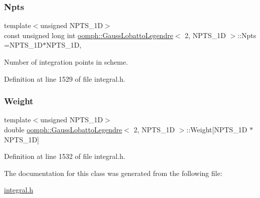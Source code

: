 \subsubsection{\texorpdfstring{Npts}{Npts}}
{\footnotesize\ttfamily template$<$unsigned N\+P\+T\+S\+\_\+1D$>$ \\
const unsigned long int \hyperlink{classoomph_1_1GaussLobattoLegendre}{oomph\+::\+Gauss\+Lobatto\+Legendre}$<$ 2, N\+P\+T\+S\+\_\+1D $>$\+::Npts =N\+P\+T\+S\+\_\+1D$\ast$N\+P\+T\+S\+\_\+1D\hspace{0.3cm}{\ttfamily [static]}, {\ttfamily [private]}}



Number of integration points in scheme. 



Definition at line 1529 of file integral.\+h.

\mbox{\label{classoomph_1_1GaussLobattoLegendre_3_012_00_01NPTS__1D_01_4_a1b5e7aa6863b1a44c51346cdf2d1edc7}} 
\subsubsection{\texorpdfstring{Weight}{Weight}}
{\footnotesize\ttfamily template$<$unsigned N\+P\+T\+S\+\_\+1D$>$ \\
double \hyperlink{classoomph_1_1GaussLobattoLegendre}{oomph\+::\+Gauss\+Lobatto\+Legendre}$<$ 2, N\+P\+T\+S\+\_\+1D $>$\+::Weight\mbox{[}N\+P\+T\+S\+\_\+1D $\ast$N\+P\+T\+S\+\_\+1D\mbox{]}\hspace{0.3cm}{\ttfamily [private]}}



Definition at line 1532 of file integral.\+h.



The documentation for this class was generated from the following file\+:\begin{DoxyCompactItemize}
\item 
\hyperlink{integral_8h}{integral.\+h}\end{DoxyCompactItemize}
